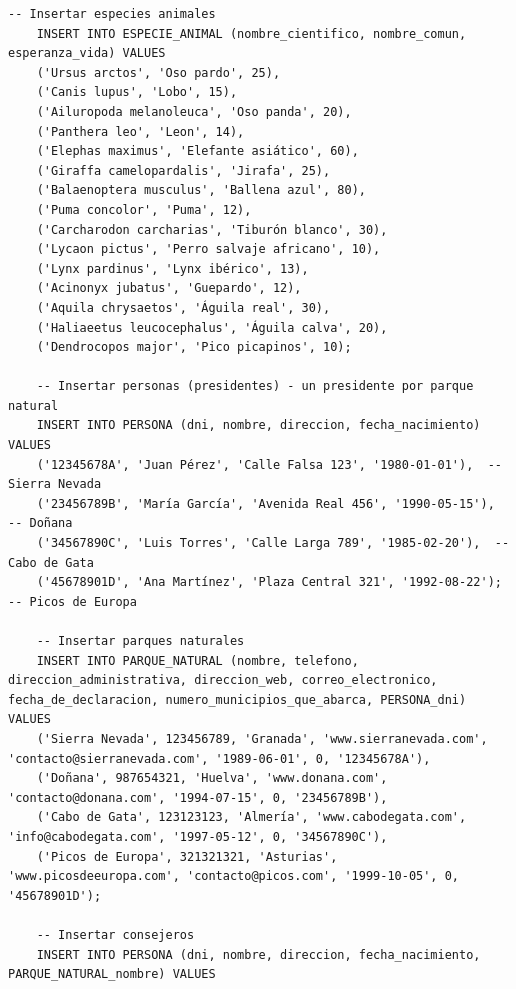 \documentclass{article}
\begin{document}
\begin{lstlisting}[style=sqlstyle, label=fig:p_insert,caption=Carga de datos]
	-- Insertar especies animales
	INSERT INTO ESPECIE_ANIMAL (nombre_cientifico, nombre_comun, esperanza_vida) VALUES
	('Ursus arctos', 'Oso pardo', 25),
	('Canis lupus', 'Lobo', 15),
	('Ailuropoda melanoleuca', 'Oso panda', 20),
	('Panthera leo', 'Leon', 14),
	('Elephas maximus', 'Elefante asiático', 60),
	('Giraffa camelopardalis', 'Jirafa', 25),
	('Balaenoptera musculus', 'Ballena azul', 80),
	('Puma concolor', 'Puma', 12),
	('Carcharodon carcharias', 'Tiburón blanco', 30),
	('Lycaon pictus', 'Perro salvaje africano', 10),
	('Lynx pardinus', 'Lynx ibérico', 13),
	('Acinonyx jubatus', 'Guepardo', 12),
	('Aquila chrysaetos', 'Águila real', 30),
	('Haliaeetus leucocephalus', 'Águila calva', 20),
	('Dendrocopos major', 'Pico picapinos', 10);
	
	-- Insertar personas (presidentes) - un presidente por parque natural
	INSERT INTO PERSONA (dni, nombre, direccion, fecha_nacimiento) VALUES
	('12345678A', 'Juan Pérez', 'Calle Falsa 123', '1980-01-01'),  -- Sierra Nevada
	('23456789B', 'María García', 'Avenida Real 456', '1990-05-15'),  -- Doñana
	('34567890C', 'Luis Torres', 'Calle Larga 789', '1985-02-20'),  -- Cabo de Gata
	('45678901D', 'Ana Martínez', 'Plaza Central 321', '1992-08-22');  -- Picos de Europa
	
	-- Insertar parques naturales
	INSERT INTO PARQUE_NATURAL (nombre, telefono, direccion_administrativa, direccion_web, correo_electronico, fecha_de_declaracion, numero_municipios_que_abarca, PERSONA_dni) VALUES
	('Sierra Nevada', 123456789, 'Granada', 'www.sierranevada.com', 'contacto@sierranevada.com', '1989-06-01', 0, '12345678A'),
	('Doñana', 987654321, 'Huelva', 'www.donana.com', 'contacto@donana.com', '1994-07-15', 0, '23456789B'),
	('Cabo de Gata', 123123123, 'Almería', 'www.cabodegata.com', 'info@cabodegata.com', '1997-05-12', 0, '34567890C'),
	('Picos de Europa', 321321321, 'Asturias', 'www.picosdeeuropa.com', 'contacto@picos.com', '1999-10-05', 0, '45678901D');
	
	-- Insertar consejeros
	INSERT INTO PERSONA (dni, nombre, direccion, fecha_nacimiento, PARQUE_NATURAL_nombre) VALUES
	

\end{lstlisting}
\end{document}
